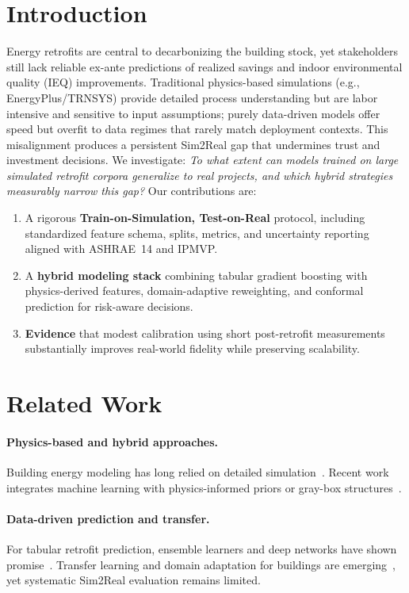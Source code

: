 ﻿\documentclass{article}
\begin{document}
\section{Introduction}
Energy retrofits are central to decarbonizing the building stock, yet stakeholders still lack reliable ex-ante predictions of realized savings and indoor environmental quality (IEQ) improvements. Traditional physics-based simulations (e.g., EnergyPlus/TRNSYS) provide detailed process understanding but are labor intensive and sensitive to input assumptions; purely data-driven models offer speed but overfit to data regimes that rarely match deployment contexts. This misalignment produces a persistent Sim2Real gap that undermines trust and investment decisions. 
We investigate: \emph{To what extent can models trained on large simulated retrofit corpora generalize to real projects, and which hybrid strategies measurably narrow this gap?}
Our contributions are:
\begin{enumerate}[leftmargin=8mm]
\item A rigorous \textbf{Train-on-Simulation, Test-on-Real} protocol, including standardized feature schema, splits, metrics, and uncertainty reporting aligned with ASHRAE~14 and IPMVP.
\item A \textbf{hybrid modeling stack} combining tabular gradient boosting with physics-derived features, domain-adaptive reweighting, and conformal prediction for risk-aware decisions.
\item \textbf{Evidence} that modest calibration using short post-retrofit measurements substantially improves real-world fidelity while preserving scalability.
\end{enumerate}

\section{Related Work}
\paragraph{Physics-based and hybrid approaches.} Building energy modeling has long relied on detailed simulation~\citep{crawley2001energyplus,klein2017trnsys,wang2015modelica}. Recent work integrates machine learning with physics-informed priors or gray-box structures~\citep{drgona2020all,heinen2022flexibility}. 
\paragraph{Data-driven prediction and transfer.} For tabular retrofit prediction, ensemble learners and deep networks have shown promise~\citep{ahmad2017review,li2021review,smarra2018data}. Transfer learning and domain adaptation for buildings are emerging~\citep{hong2020transfer,mahnke2022transfer,li2022domain}, yet systematic Sim2Real evaluation remains limited. 
\end{document}
